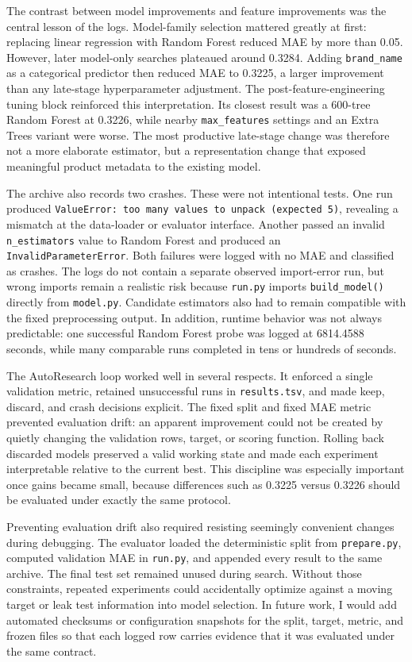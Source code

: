 The contrast between model improvements and feature improvements was the central lesson of the logs. Model-family selection mattered greatly at first: replacing linear regression with Random Forest reduced MAE by more than 0.05. However, later model-only searches plateaued around 0.3284. Adding \texttt{brand\_name} as a categorical predictor then reduced MAE to 0.3225, a larger improvement than any late-stage hyperparameter adjustment. The post-feature-engineering tuning block reinforced this interpretation. Its closest result was a 600-tree Random Forest at 0.3226, while nearby \texttt{max\_features} settings and an Extra Trees variant were worse. The most productive late-stage change was therefore not a more elaborate estimator, but a representation change that exposed meaningful product metadata to the existing model.

The archive also records two crashes. These were not intentional tests. One run produced \texttt{ValueError: too many values to unpack (expected 5)}, revealing a mismatch at the data-loader or evaluator interface. Another passed an invalid \texttt{n\_estimators} value to Random Forest and produced an \texttt{InvalidParameterError}. Both failures were logged with no MAE and classified as crashes. The logs do not contain a separate observed import-error run, but wrong imports remain a realistic risk because \texttt{run.py} imports \texttt{build\_model()} directly from \texttt{model.py}. Candidate estimators also had to remain compatible with the fixed preprocessing output. In addition, runtime behavior was not always predictable: one successful Random Forest probe was logged at 6814.4588 seconds, while many comparable runs completed in tens or hundreds of seconds.

The AutoResearch loop worked well in several respects. It enforced a single validation metric, retained unsuccessful runs in \texttt{results.tsv}, and made keep, discard, and crash decisions explicit. The fixed split and fixed MAE metric prevented evaluation drift: an apparent improvement could not be created by quietly changing the validation rows, target, or scoring function. Rolling back discarded models preserved a valid working state and made each experiment interpretable relative to the current best. This discipline was especially important once gains became small, because differences such as 0.3225 versus 0.3226 should be evaluated under exactly the same protocol.

Preventing evaluation drift also required resisting seemingly convenient changes during debugging. The evaluator loaded the deterministic split from \texttt{prepare.py}, computed validation MAE in \texttt{run.py}, and appended every result to the same archive. The final test set remained unused during search. Without those constraints, repeated experiments could accidentally optimize against a moving target or leak test information into model selection. In future work, I would add automated checksums or configuration snapshots for the split, target, metric, and frozen files so that each logged row carries evidence that it was evaluated under the same contract.

